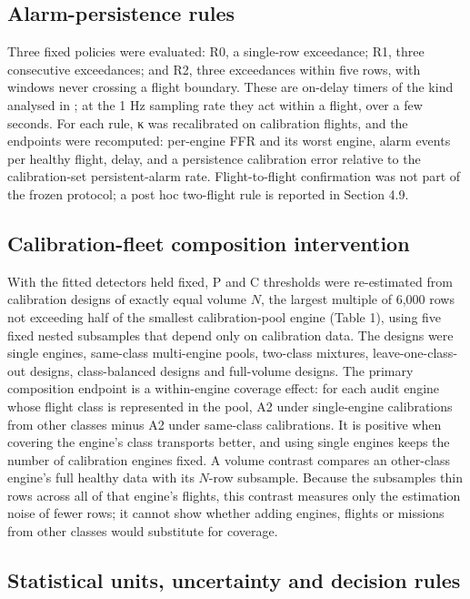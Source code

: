 \documentclass[preprint,11pt,a4paper]{elsarticle}
\begin{document}
\subsection{Alarm-persistence rules}

Three fixed policies were evaluated: R0, a single-row exceedance; R1, three consecutive exceedances; and R2, three exceedances within five rows, with windows never crossing a flight boundary. These are on-delay timers of the kind analysed in \cite{N39,N40}; at the 1 Hz sampling rate they act within a flight, over a few seconds. For each rule, κ was recalibrated on calibration flights, and the endpoints were recomputed: per-engine FFR and its worst engine, alarm events per healthy flight, delay, and a persistence calibration error relative to the calibration-set persistent-alarm rate. Flight-to-flight confirmation was not part of the frozen protocol; a post hoc two-flight rule is reported in Section 4.9.

\subsection{Calibration-fleet composition intervention}

With the fitted detectors held fixed, P and C thresholds were re-estimated from calibration designs of exactly equal volume $N$, the largest multiple of 6,000 rows not exceeding half of the smallest calibration-pool engine (Table 1), using five fixed nested subsamples that depend only on calibration data. The designs were single engines, same-class multi-engine pools, two-class mixtures, leave-one-class-out designs, class-balanced designs and full-volume designs. The primary composition endpoint is a within-engine coverage effect: for each audit engine whose flight class is represented in the pool, A2 under single-engine calibrations from other classes minus A2 under same-class calibrations. It is positive when covering the engine's class transports better, and using single engines keeps the number of calibration engines fixed. A volume contrast compares an other-class engine's full healthy data with its $N$-row subsample. Because the subsamples thin rows across all of that engine's flights, this contrast measures only the estimation noise of fewer rows; it cannot show whether adding engines, flights or missions from other classes would substitute for coverage.

\subsection{Statistical units, uncertainty and decision rules}
\end{document}
